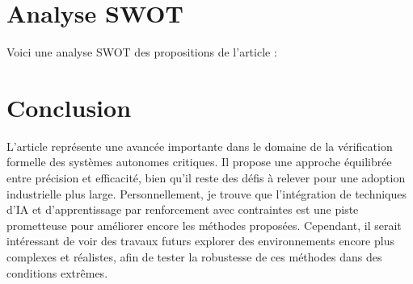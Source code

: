 \documentclass[../CSC_5RO10_TA.tex]{subfiles}
\begin{document}
\section{Analyse SWOT}
\noindent Voici une analyse SWOT des propositions de l'article :

\section{Conclusion}
\noindent L'article représente une avancée importante dans le domaine de la vérification formelle des systèmes autonomes critiques. Il propose une approche équilibrée entre précision et efficacité, bien qu'il reste des défis à relever pour une adoption industrielle plus large. Personnellement, je trouve que l'intégration de techniques d'IA et d'apprentissage par renforcement avec contraintes est une piste prometteuse pour améliorer encore les méthodes proposées. Cependant, il serait intéressant de voir des travaux futurs explorer des environnements encore plus complexes et réalistes, afin de tester la robustesse de ces méthodes dans des conditions extrêmes.
\end{document}
